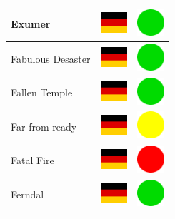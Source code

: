 \documentclass[12pt, a4paper, twoside]{report}
\begin{document}
\begin{center}
\begin{longtable}{|p{5cm}|p{2cm}|p{2cm}|}
Exumer & \includegraphics[width=1cm]{4x3/de} & \includegraphics[width=1cm]{likes/y} \\ \hline
Fabulous Desaster & \includegraphics[width=1cm]{4x3/de} & \includegraphics[width=1cm]{likes/y} \\ \hline
Fallen Temple & \includegraphics[width=1cm]{4x3/de} & \includegraphics[width=1cm]{likes/y} \\ \hline
Far from ready & \includegraphics[width=1cm]{4x3/de} & \includegraphics[width=1cm]{likes/m} \\ \hline
Fatal Fire & \includegraphics[width=1cm]{4x3/de} & \includegraphics[width=1cm]{likes/n} \\ \hline
Ferndal & \includegraphics[width=1cm]{4x3/de} & \includegraphics[width=1cm]{likes/y} \\ \hline

\end{longtable}
\end{center}
\end{document}

